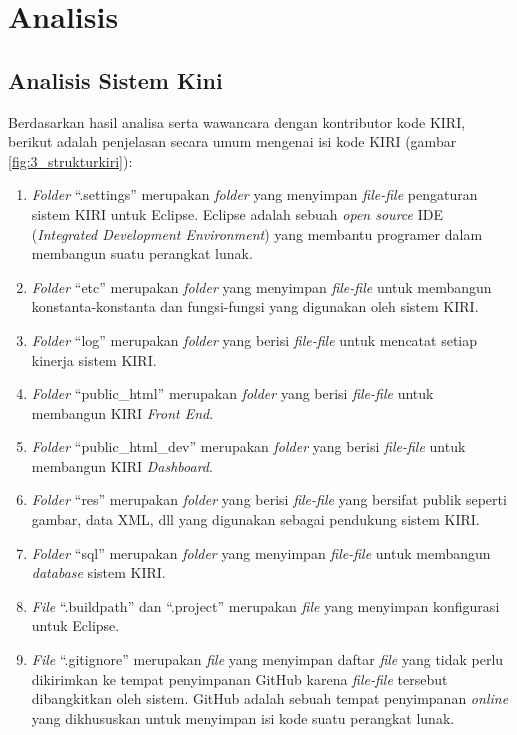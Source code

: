 \chapter{Analisis}
\label{chap:analisis}

\section{Analisis Sistem Kini}
\label{sec:analisissistemkini}
Berdasarkan hasil analisa serta wawancara dengan kontributor kode KIRI, berikut adalah penjelasan secara umum mengenai isi kode KIRI (gambar \ref{fig:3_strukturkiri}):
\begin{enumerate}
	\item \textit{Folder} ``.settings'' merupakan \textit{folder} yang menyimpan \textit{file-file} pengaturan sistem KIRI untuk Eclipse. Eclipse adalah sebuah \textit{open source} IDE (\textit{Integrated Development Environment}) yang membantu programer dalam membangun suatu perangkat lunak\cite{eclipse}.
	\item \textit{Folder} ``etc'' merupakan \textit{folder} yang menyimpan \textit{file-file} untuk membangun konstanta-konstanta dan fungsi-fungsi yang digunakan oleh sistem KIRI.
	\item \textit{Folder} ``log'' merupakan \textit{folder} yang berisi \textit{file-file} untuk mencatat setiap kinerja sistem KIRI.
	\item \textit{Folder} ``public\_html'' merupakan \textit{folder} yang berisi \textit{file-file} untuk membangun KIRI \textit{Front End}.
	\item \textit{Folder} ``public\_html\_dev'' merupakan \textit{folder} yang berisi \textit{file-file} untuk membangun KIRI \textit{Dashboard}.
	\item \textit{Folder} ``res'' merupakan \textit{folder} yang berisi \textit{file-file} yang bersifat publik seperti gambar, data XML, dll yang digunakan sebagai pendukung sistem KIRI.
	\item \textit{Folder} ``sql'' merupakan \textit{folder} yang menyimpan \textit{file-file} untuk membangun \textit{database} sistem KIRI.
	\item \textit{File} ``.buildpath'' dan ``.project'' merupakan \textit{file} yang menyimpan konfigurasi untuk Eclipse.
	\item \textit{File} ``.gitignore'' merupakan \textit{file} yang menyimpan daftar \textit{file} yang tidak perlu dikirimkan ke tempat penyimpanan GitHub karena \textit{file-file} tersebut dibangkitkan oleh sistem. GitHub adalah sebuah tempat penyimpanan \textit{online} yang dikhususkan untuk menyimpan isi kode suatu perangkat lunak\cite{github}.

\end{enumerate}
